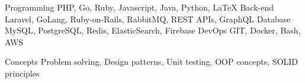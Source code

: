 

\begin{cvskills}

  \cvskill
    {Programming}
    {PHP, Go, Ruby, Javascript, Java, Python, LaTeX}
  \cvskill
    {Back-end}
    {
      Laravel, GoLang, Ruby-on-Rails, RabbitMQ, REST APIs, GraphQL
    } 
  \cvskill
    {Database}
    {
      MySQL, PostgreSQL, Redis, ElasticSearch, Firebase
    } 
  \cvskill
    {DevOps}
    {GIT, Docker, Bash, AWS}



  \cvskill
    {Concepts}
    {Problem solving, Design patterns, Unit testing, OOP concepts, SOLID principles}

\end{cvskills}

